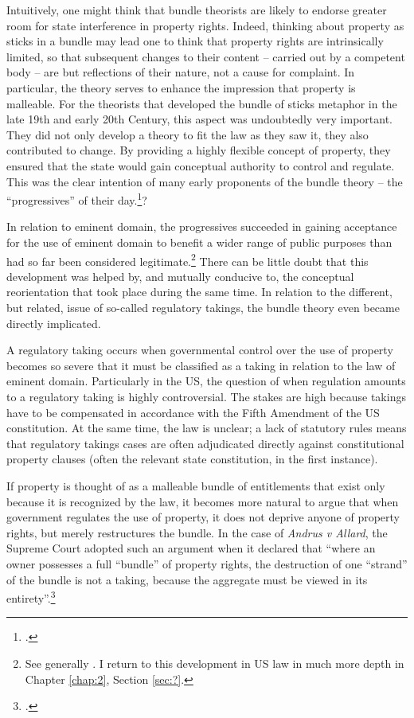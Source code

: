 Intuitively, one might think that bundle theorists are likely to endorse greater room for state interference in property rights. Indeed, thinking about property as sticks in a bundle may lead one to think that property rights are intrinsically limited, so that subsequent changes to their content -- carried out by a competent body -- are but reflections of their nature, not a cause for complaint. In particular, the theory serves to enhance the impression that property is malleable. For the theorists that developed the bundle of sticks metaphor in the late 19th and early 20th Century, this aspect was undoubtedly very important. They did not only develop a theory to fit the law as they saw it, they also contributed to change. By providing a highly flexible concept of property, they ensured that the state would gain conceptual authority to control and regulate. This was the clear intention of many early proponents of the bundle theory -- the ``progressives'' of their day.\footcite[195]{klein11}?

In relation to eminent domain, the progressives succeeded in gaining acceptance for the use of eminent domain to benefit a wider range of public purposes than had so far been considered legitimate.\footnote{See generally \cite{yale49}. I return to this development in US law in much more depth in Chapter \ref{chap:2}, Section \ref{sec:?}. } There can be little doubt that this development was helped by, and mutually conducive to, the conceptual reorientation that took place during the same time. In relation to the different, but related, issue of so-called regulatory takings, the bundle theory even  became directly implicated. 

A regulatory taking occurs when governmental control over the use of property becomes so severe that it must be classified as a taking in relation to the law of eminent domain. Particularly in the US, the question of when regulation amounts to a regulatory taking is highly controversial. The stakes are high because takings have to be compensated in accordance with the Fifth Amendment of the US constitution. At the same time, the law is unclear; a lack of statutory rules means that regulatory takings cases are often adjudicated directly against constitutional property clauses (often the relevant state constitution, in the first instance).

If property is thought of as a malleable bundle of entitlements that exist only because it is recognized by the law, it becomes more natural to argue that when government regulates the use of property, it does not deprive anyone of property rights, but merely restructures the bundle. In the case of {\it Andrus v Allard}, the Supreme Court adopted such an argument when it declared that ``where an owner possesses a full ``bundle'' of property rights, the destruction of one ``strand'' of the bundle is not a taking, because the aggregate must be viewed in its entirety''.\footcite[65--66]{andrus79}

